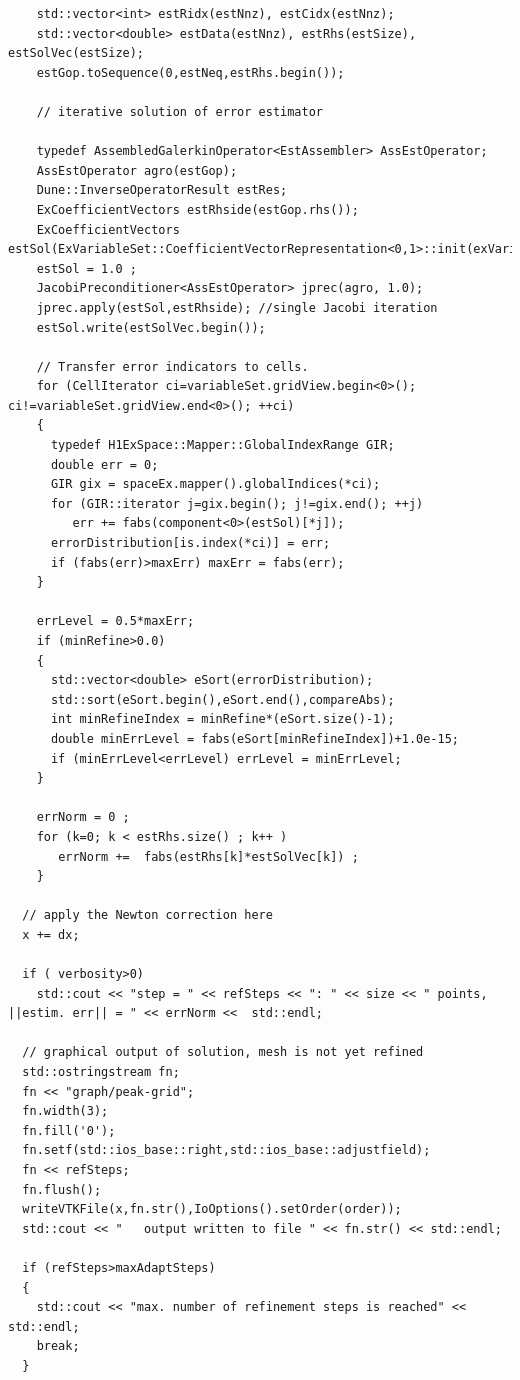 \documentclass[11pt]{article}
\begin{document}
\begin{lstlisting}
    std::vector<int> estRidx(estNnz), estCidx(estNnz);
    std::vector<double> estData(estNnz), estRhs(estSize), estSolVec(estSize);
    estGop.toSequence(0,estNeq,estRhs.begin());

    // iterative solution of error estimator

    typedef AssembledGalerkinOperator<EstAssembler> AssEstOperator;
    AssEstOperator agro(estGop);
    Dune::InverseOperatorResult estRes;
    ExCoefficientVectors estRhside(estGop.rhs());
    ExCoefficientVectors estSol(ExVariableSet::CoefficientVectorRepresentation<0,1>::init(exVariableSet));
    estSol = 1.0 ;
    JacobiPreconditioner<AssEstOperator> jprec(agro, 1.0);
    jprec.apply(estSol,estRhside); //single Jacobi iteration
    estSol.write(estSolVec.begin());

    // Transfer error indicators to cells.
    for (CellIterator ci=variableSet.gridView.begin<0>(); ci!=variableSet.gridView.end<0>(); ++ci)
    {
      typedef H1ExSpace::Mapper::GlobalIndexRange GIR;
      double err = 0;
      GIR gix = spaceEx.mapper().globalIndices(*ci);
      for (GIR::iterator j=gix.begin(); j!=gix.end(); ++j)
         err += fabs(component<0>(estSol)[*j]);
      errorDistribution[is.index(*ci)] = err;
      if (fabs(err)>maxErr) maxErr = fabs(err);
    }

    errLevel = 0.5*maxErr;
    if (minRefine>0.0)
    {
      std::vector<double> eSort(errorDistribution);
      std::sort(eSort.begin(),eSort.end(),compareAbs);
      int minRefineIndex = minRefine*(eSort.size()-1);
      double minErrLevel = fabs(eSort[minRefineIndex])+1.0e-15;
      if (minErrLevel<errLevel) errLevel = minErrLevel;
    }

    errNorm = 0 ;
    for (k=0; k < estRhs.size() ; k++ )
       errNorm +=  fabs(estRhs[k]*estSolVec[k]) ;
    }
    
  // apply the Newton correction here
  x += dx;

  if ( verbosity>0) 
    std::cout << "step = " << refSteps << ": " << size << " points,   ||estim. err|| = " << errNorm <<  std::endl;

  // graphical output of solution, mesh is not yet refined
  std::ostringstream fn;
  fn << "graph/peak-grid";
  fn.width(3);
  fn.fill('0');
  fn.setf(std::ios_base::right,std::ios_base::adjustfield);
  fn << refSteps;
  fn.flush();
  writeVTKFile(x,fn.str(),IoOptions().setOrder(order));
  std::cout << "   output written to file " << fn.str() << std::endl;

  if (refSteps>maxAdaptSteps) 
  {
    std::cout << "max. number of refinement steps is reached" << std::endl;
    break;
  }


\end{lstlisting}
\end{document}

